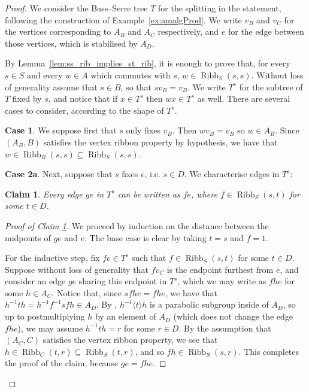 \documentclass[svgnames]{amsart}
\theoremstyle{plain}
\newtheorem{claim}[thm]{Claim}
\theoremstyle{definition}
\newenvironment{claimproof}{\renewcommand{\qedsymbol}{$\blacksquare$}\begin{proof}}{\end{proof}}
\newcommand{\ribb}[3]{\operatorname{Ribb}_{#1}(#2,#3)}
\begin{document}
\begin{proof} We consider the Bass--Serre tree $T$ for the splitting in the statement, following the construction of Example~\ref{ex:amalgProd}. We write $v_B$ and $v_C$ for the vertices corresponding to $A_B$ and $A_C$ respectively, and $e$ for the edge between those vertices, which is stabilised by $A_D$. 
    
By Lemma~\ref{lem:ss_rib_implies_st_rib}, it is enough to prove that, for every $s\in S$ and every $w\in A$ which commutes with $s$, $w\in \ribb{S}{s}{s}$. Without loss of generality assume that $s\in B$, so that $sv_B=v_B$. We write $T^s$ for the subtree of $T$ fixed by $s$, and notice that if $x \in T^s$ then $wx \in T^s$ as well. There are several cases to consider, according to the shape of $T^s$.

    \textbf{Case 1}. We suppose first that $s$ only fixes $v_B$. Then $wv_B = v_B$ so $w \in A_B$. Since $(A_B,B)$ satisfies the vertex ribbon property by hypothesis, we have that $w \in \ribb{B}{s}{s} \subseteq \ribb{S}{s}{s}$.
\par\medskip
    \textbf{Case 2a}. Next, suppose that $s$ fixes $e$, i.e. $s\in D$. We characterise edges in $T^s$:
    \begin{claim}\label{claim:rib}
        Every edge $ge$ in $T^s$ can be written as $fe$, where $f \in \ribb{S}{s}{t}$ for some $t \in D$.
    \end{claim}
    \begin{claimproof}[Proof of Claim \ref{claim:rib}]
        We proceed by induction on the distance between the midpoints of $ge$ and $e$. The base case is clear by taking $t = s$ and $f = 1$.

        For the inductive step, fix $fe \in T^s$ such that $f \in \ribb{S}{s}{t}$ for some $t\in D$. Suppose without loss of generality that $fv_C$ is the endpoint furthest from $e$, and consider an edge $ge$ sharing this endpoint in $T^s$, which we may write as $fhe$ for some $h \in A_C$. Notice that, since $sfhe = fhe$, we have that $h^{-1}th = h^{-1}f^{-1}sfh \in A_D$. By \cite[Theorem 1.1]{blufstein2023parabolic}, $h^{-1}\langle t \rangle h$ is a parabolic subgroup inside of $A_D$, so up to postmultiplying $h$ by an element of $A_D$ (which does not change the edge $fhe$), we may assume $h^{-1}th = r$ for some $r \in D$. By the assumption that $(A_C,C)$ satisfies the vertex ribbon property, we see that $h \in \ribb{C}{t}{r} \subseteq \ribb{S}{t}{r}$, and so $fh \in \ribb{S}{s}{r}$. This completes the proof of the claim, because $ge=fhe$.
    \end{claimproof}


\end{proof}
\end{document}
